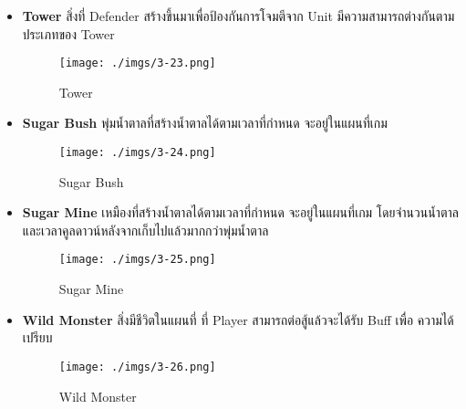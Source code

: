\documentclass[12pt,oneside,openright,a4paper]{cpe-thai-project}
\begin{document}
\begin{itemize}
  \pagebreak  
  \item \textbf{Tower} สิ่งที่ Defender สร้างขึ้นมาเพื่อป้องกันการโจมตีจาก Unit 				
  มีความสามารถต่างกันตามประเภทของ Tower
    
    \begin{figure}[H]\centering
      \texttt{[image: ./imgs/3-23.png]}
      \caption{Tower}\label{fig:3-23}
    \end{figure}

  \item \textbf{Sugar Bush} พุ่มน้ำตาลที่สร้างน้ำตาลได้ตามเวลาที่กำหนด จะอยู่ในแผนที่เกม
      
    \begin{figure}[H]\centering
      \texttt{[image: ./imgs/3-24.png]}
      \caption{Sugar Bush}\label{fig:3-24}
    \end{figure}

  \item \textbf{Sugar Mine} เหมืองที่สร้างน้ำตาลได้ตามเวลาที่กำหนด จะอยู่ในแผนที่เกม 
  โดยจำนวนน้ำตาลและเวลาคูลดาวน์หลังจากเก็บไปแล้วมากกว่าพุ่มน้ำตาล
      
    \begin{figure}[H]\centering
      \texttt{[image: ./imgs/3-25.png]}
      \caption{Sugar Mine}\label{fig:3-25}
    \end{figure}
  
  \item \textbf{Wild Monster} สิ่งมีชีวิตในแผนที่ ที่ Player สามารถต่อสู้แล้วจะได้รับ Buff เพื่อ
  ความได้เปรียบ

    \begin{figure}[H]\centering
      \texttt{[image: ./imgs/3-26.png]}
      \caption{Wild Monster}\label{fig:3-26}
    \end{figure}
\end{itemize}
  
\end{document}
